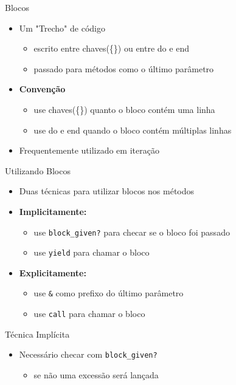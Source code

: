 
\begin{frame}{Blocos}
  \begin{itemize}
    \item Um "Trecho" de código
    \begin{itemize}
      \item escrito entre chaves(\{\}) ou entre \alert{do} e \alert{end}
      \item passado para métodos como o \alert{último} parâmetro
    \end{itemize}
    \item \textbf{Convenção} 
    \begin{itemize}
      \item use chaves(\{\}) quanto o bloco contém uma linha
      \item use \alert{do} e \alert{end} quando o bloco contém múltiplas linhas
    \end{itemize}
    \item Frequentemente utilizado em \alert{iteração}
  \end{itemize}
  
  
    
\end{frame}

\begin{frame}[fragile,t]{Utilizando Blocos}
  \begin{itemize}
    \item Duas técnicas para utilizar blocos nos métodos
    \item \textbf{Implicitamente:}
    \begin{itemize}
      \item use \verb!block_given?! para checar se o bloco foi passado
      \item use \verb!yield! para \alert{chamar} o bloco
    \end{itemize}
    \item \textbf{Explicitamente:}
    \begin{itemize}
      \item use \verb!&! como prefixo do último parâmetro
      \item use \verb!call! para \alert{chamar} o bloco
    \end{itemize} 
  \end{itemize}   
\end{frame}

\begin{frame}{Técnica Implícita}
  \begin{itemize}
    \item Necessário checar com \verb!block_given?! 
    \begin{itemize}
    	\item se não uma excessão será lançada
    \end{itemize}
    
	
  \end{itemize}   
\end{frame}


